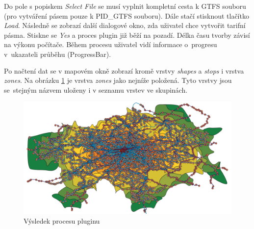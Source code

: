 Do pole s popiskem \textit{Select File} se musí vyplnit kompletní cesta k GTFS  souboru 
(pro vytváření pásem pouze k PID\_GTFS  souboru). Dále stačí stisk\-nout tlačítko \textit{Load}.
Následně se zobrazí další dialogové okno, zda uživatel chce vytvořit tarifní pásma. Stiskne se
\textit{Yes} a proces plugin již běží na pozadí. Délka času tvorby závisí na výkonu počítače. 
Během procesu uživatel vidí informace o~progresu v~ukazateli průběhu (ProgressBar). 

Po načtení dat se v mapovém okně zobrazí kromě vrstvy \textit{shapes} a \textit{stops} i vrstva 
\textit{zones}. Na obrázku \ref{fig:gtfs_loader_vysledek} je vrstva \textit{zones}
jako nejníže položená. Tyto vrstvy jsou se~stejným názvem uloženy i v seznamu vrstev ve skupinách.

\begin{figure}[H] \centering
    \includegraphics[width=400pt]{./pictures-dodatek/visualization.png}
    \caption[Výsledek procesu pluginu]{Výsledek procesu pluginu}
	\label{fig:gtfs_loader_vysledek}              
\end{figure} 